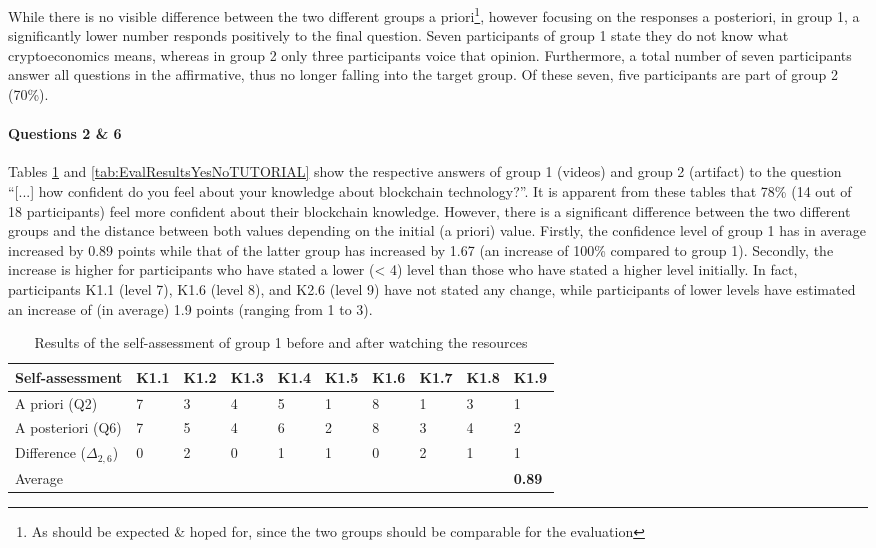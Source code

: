 While there is no visible difference between the two different groups a priori\footnote{As should be expected \& hoped for, since the two groups should be comparable for the evaluation}, however focusing on the responses a posteriori, in group 1, a significantly lower number responds positively to the final question. Seven participants of group 1 state they do not know what cryptoeconomics means, whereas in group 2 only three participants voice that opinion. Furthermore, a total number of seven participants answer all questions in the affirmative, thus no longer falling into the target group. Of these seven, five participants are part of group 2 (70\%).

\paragraph{Questions 2 \& 6} Tables \ref{tab:EvalResultsYesNoVIDEO} and \ref{tab:EvalResultsYesNoTUTORIAL} show the respective answers of group 1 (videos) and group 2 (artifact) to the question \enquote{[...] how confident do you feel about your knowledge about blockchain technology?}.
It is apparent from these tables that 78\% (14 out of 18 participants) feel more confident about their blockchain knowledge. However, there is a significant difference between the two different groups and the distance between both values depending on the initial (a priori) value. Firstly, the confidence level of group 1 has in average increased by 0.89 points while that of the latter group has increased by 1.67 (an increase of 100\% compared to group 1). Secondly, the increase is higher for participants who have stated a lower (< 4) level than those who have stated a higher level initially. In fact, participants K1.1 (level 7), K1.6 (level 8), and K2.6 (level 9) have not stated any change, while participants of lower levels have estimated an increase of (in average) 1.9 points (ranging from 1 to 3).   


\begin{table}[]
    \centering
    \begin{tabular}{l | l l l l l l l l l }
          Self-assessment & K1.1 & K1.2 & K1.3 & K1.4 & K1.5 & K1.6 & K1.7 & K1.8 & K1.9  \\
         \hline
         A priori (Q2) & 7 & 3 & 4 & 5 & 1 & 8 & 1 & 3 & 1 \\
         A posteriori (Q6) & 7 & 5 & 4 & 6 & 2 & 8 & 3 & 4 & 2 \\
          \hline 
         Difference ($\Delta_{2,6}$) & 0 & 2 & 0 & 1 & 1 & 0 & 2 & 1 & 1 \\
         Average & & & & & & & & & \textbf{0.89} \cellcolor[gray]{0.9} \\
    \end{tabular}
    \caption{Results of the self-assessment of group 1 before and after watching the resources}
    \label{tab:EvalResultsYesNoVIDEO}
\end{table}


